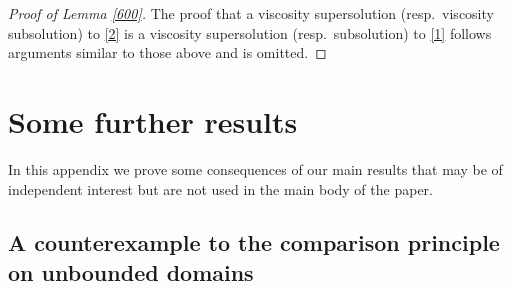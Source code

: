 \documentclass[12pt]{article}
\numberwithin{equation}{section}
\theoremstyle{plain}
\theoremstyle{definition}
\begin{document}
\begin{appendices}
\begin{proof}[Proof of Lemma \ref{600}]
	
	The proof that a viscosity supersolution (resp.~viscosity subsolution) to \eqref{2} is a viscosity supersolution (resp.~subsolution) to \eqref{1} follows arguments similar to those above and is omitted. 
\end{proof}


	
\section{Some further results}\label{appb}

In this appendix we prove some consequences of our main results that may be of independent interest but are not used in the main body of the paper.
	
\subsection{A counterexample to the comparison principle on unbounded domains}


\end{appendices}
\end{document}

